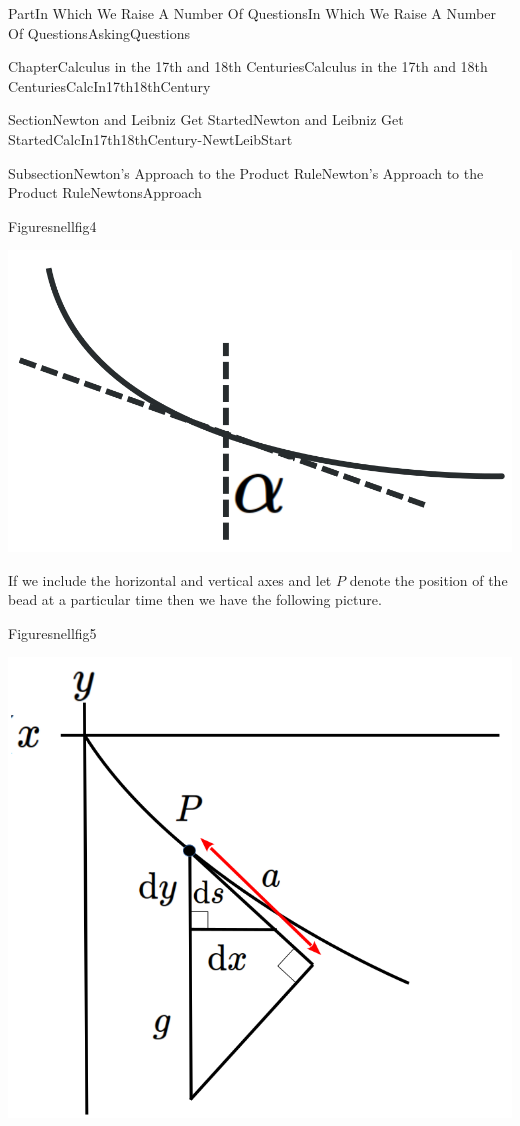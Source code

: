 \documentclass[oneside,10pt,]{book}
\numberwithin{equation}{part}
\begin{document}
\begin{partptx}{Part}{In Which We Raise A Number Of Questions}{}{In Which We Raise A Number Of Questions}{}{}{AskingQuestions}
\begin{chapterptx}{Chapter}{Calculus in the 17th and 18th Centuries}{}{Calculus in the 17th and 18th Centuries}{}{}{CalcIn17th18thCentury}
\begin{sectionptx}{Section}{Newton and Leibniz Get Started}{}{Newton and Leibniz Get Started}{}{}{CalcIn17th18thCentury-NewtLeibStart}
\begin{subsectionptx}{Subsection}{Newton's Approach to the Product Rule}{}{Newton's Approach to the Product Rule}{}{}{NewtonsApproach}
\begin{figureptx}{Figure}{}{snellfig4}{}
\begin{image}{0.3}{0.4}{0.3}{}
\includegraphics[width=\linewidth]{external/images/snellfig4-1.png}
\end{image}%
\tcblower
\end{figureptx}%
If we include the horizontal and vertical axes and let \(P\) denote the position of the bead at a particular time then we have the following picture.%
\begin{figureptx}{Figure}{}{snellfig5}{}%
\begin{image}{0.225}{0.55}{0.225}{}%
\includegraphics[width=\linewidth]{external/images/snellfig5-1.png}
\end{image}%
\tcblower
\end{figureptx}%

\end{subsectionptx}
\end{sectionptx}
\end{chapterptx}
\end{partptx}
\end{document}
